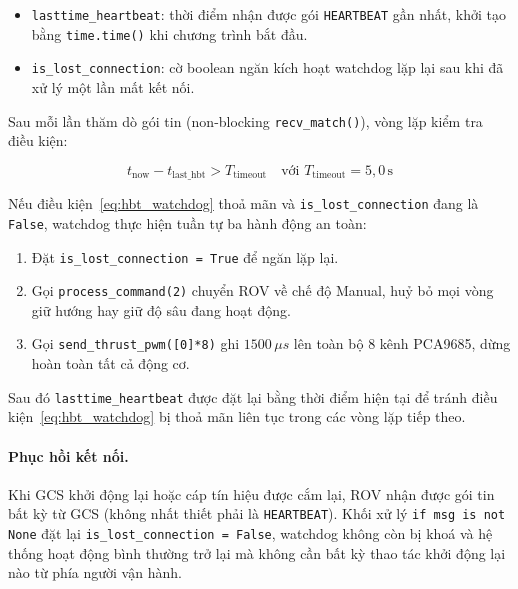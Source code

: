 \documentclass[../DoAn.tex]{subfiles}
\begin{document}
\begin{itemize}
    \item \texttt{lasttime\_heartbeat}: thời điểm nhận được gói
    \texttt{HEARTBEAT} gần nhất, khởi tạo bằng \texttt{time.time()}
    khi chương trình bắt đầu.
    \item \texttt{is\_lost\_connection}: cờ boolean ngăn kích hoạt
    watchdog lặp lại sau khi đã xử lý một lần mất kết nối.
\end{itemize}
 
Sau mỗi lần thăm dò gói tin (non-blocking \texttt{recv\_match()}),
vòng lặp kiểm tra điều kiện:
 
\begin{equation}
    t_{\text{now}} - t_{\text{last\_hbt}} > T_{\text{timeout}}
    \quad \text{với } T_{\text{timeout}} = 5{,}0\,\text{s}
    \label{eq:hbt_watchdog}
\end{equation}
 
Nếu điều kiện~\eqref{eq:hbt_watchdog} thoả mãn và
\texttt{is\_lost\_connection} đang là \texttt{False}, watchdog thực
hiện tuần tự ba hành động an toàn:
 
\begin{enumerate}
    \item Đặt \texttt{is\_lost\_connection = True} để ngăn lặp lại.
    \item Gọi \texttt{process\_command(2)} chuyển ROV về chế độ
    Manual, huỷ bỏ mọi vòng giữ hướng hay giữ độ sâu đang hoạt
    động.
    \item Gọi \texttt{send\_thrust\_pwm([0]*8)} ghi $1500\,\mu s$
    lên toàn bộ 8 kênh PCA9685, dừng hoàn toàn tất cả động cơ.
\end{enumerate}
 
Sau đó \texttt{lasttime\_heartbeat} được đặt lại bằng thời điểm
hiện tại để tránh điều kiện~\eqref{eq:hbt_watchdog} bị thoả mãn
liên tục trong các vòng lặp tiếp theo.
 
\paragraph{Phục hồi kết nối.}
 
Khi GCS khởi động lại hoặc cáp tín hiệu được cắm lại, ROV nhận
được gói tin bất kỳ từ GCS (không nhất thiết phải là
\texttt{HEARTBEAT}). Khối xử lý \texttt{if msg is not None} đặt
lại \texttt{is\_lost\_connection = False}, watchdog không còn bị
khoá và hệ thống hoạt động bình thường trở lại mà không cần bất kỳ
thao tác khởi động lại nào từ phía người vận hành.
 
\end{document}
